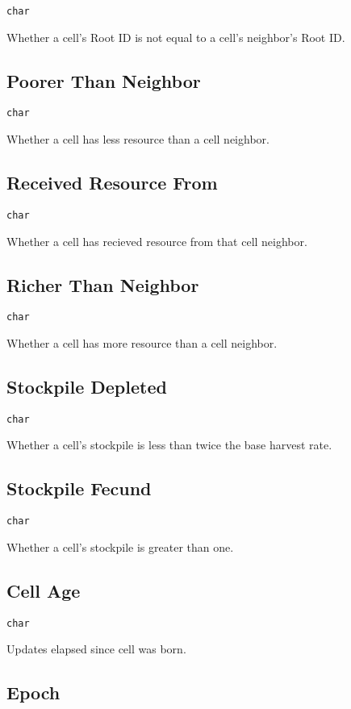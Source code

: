 \texttt{char}

Whether a cell's Root ID is not equal to a cell's neighbor's Root ID.

\subsection{Poorer Than Neighbor}

\texttt{char}

Whether a cell has less resource than a cell neighbor.

\subsection{Received Resource From}

\texttt{char}

Whether a cell has recieved resource from that cell neighbor.

\subsection{Richer Than Neighbor}

\texttt{char}

Whether a cell has more resource than a cell neighbor.

\subsection{Stockpile Depleted}

\texttt{char}

Whether a cell's stockpile is less than twice the base harvest rate.

\subsection{Stockpile Fecund}

\texttt{char}

Whether a cell's stockpile is greater than one.

\subsection{Cell Age}

\texttt{char}

Updates elapsed since cell was born.

\subsection{Epoch}

